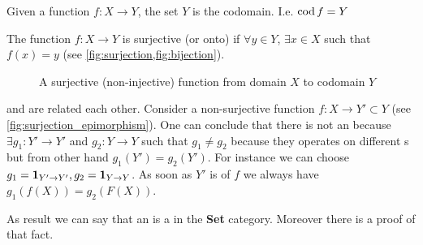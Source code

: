 \begin{example}[Codomain]
  \label{ex:codomain_set}
  Given a function $f: X \to Y$, the set $Y$ is the codomain. I.e.
  $\operatorname{cod} f = Y$
\end{example}


\begin{definition}[Surjection]
  \label{def:surjection}
  The function $f: X \rightarrow Y$ is surjective (or onto) if
  $\forall y \in Y$, $\exists x \in X$ such that
  $f\left(x\right) = y$ (see \cref{fig:surjection,fig:bijection}).
\end{definition}

\begin{figure}
  \centering
  \caption{A surjective (non-injective) function from domain $X$ to
    codomain $Y$ }
  \label{fig:surjection}
\end{figure}


\begin{remark}
  \label{rem:surjection_epimorphism}
   and  are
  related each other. Consider a non-surjective function $f: X
  \rightarrow Y' \subset Y$ (see \cref{fig:surjection_epimorphism}). One can
  conclude that there is not an  because  
  $\exists g_1: Y' \to Y'$ and  $g_2 : Y \to Y$ such
  that $g_1 \ne g_2$ because they operates on different
  s but from other hand $g_1(Y') = g_2(Y')$. For
  instance we can choose $g_1 = \mathbf{1}_{ Y' \to Y' }, g_2=\mathbf{1}_{ Y \to Y }$. As
  soon as $Y'$ is  of $f$ we always have
  $g_1(f(X)) = g_2(F(X))$.
  
  As result we can say that an  is a
   in the \textbf{Set} category. Moreover
  there is a proof 
  \cite{bib:proofwiki:Surjection_iff_Epimorphism_in_Category_of_Sets}
  of that fact.

\end{remark}


